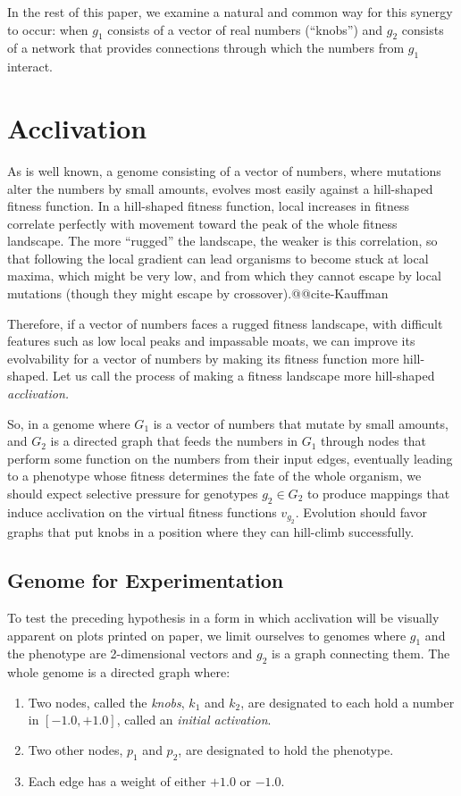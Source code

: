 \documentclass[letterpaper]{article}
\begin{document}
In the rest of this paper, we examine a natural and common way for this
synergy to occur: when $g_1$ consists of a vector of real numbers (``knobs'')
and $g_2$ consists of a network that provides connections through which the
numbers from $g_1$ interact.

\section{Acclivation}

As is well known, a genome consisting of a vector of numbers, where mutations
alter the numbers by small amounts, evolves most easily against a hill-shaped
fitness function. In a hill-shaped fitness function, local increases in
fitness correlate perfectly with movement toward the peak of the whole fitness
landscape. The more ``rugged'' the landscape, the weaker is this correlation,
so that following the local gradient can lead organisms to become stuck at
local maxima, which might be very low, and from which they cannot escape by
local mutations (though they might escape by crossover).@@cite-Kauffman

Therefore, if a vector of numbers faces a rugged fitness landscape, with
difficult features such as low local peaks and impassable moats, we can
improve its evolvability for a vector of numbers by making its fitness
function more hill-shaped. Let us call the process of making a fitness
landscape more hill-shaped \textit{acclivation.}

So, in a genome where $G_1$ is a vector of numbers that mutate by small
amounts, and $G_2$ is a directed graph that feeds the numbers in $G_1$ through
nodes that perform some function on the numbers from their input edges,
eventually leading to a phenotype whose fitness determines the fate of the
whole organism, we should expect selective pressure for genotypes $g_2 \in
G_2$ to produce mappings that induce acclivation on the virtual fitness
functions $v_{g_2}$. Evolution should favor graphs that put knobs in a
position where they can hill-climb successfully.

\subsection{Genome for Experimentation}

To test the preceding hypothesis in a form in which acclivation will be
visually apparent on plots printed on paper, we limit ourselves to genomes
where $g_1$ and the phenotype are 2-dimensional vectors and $g_2$ is a graph
connecting them.  The whole genome is a directed graph where:
\begin{enumerate}
   \item Two nodes, called the \textit{knobs}, $k_1$ and $k_2$, are designated
      to each hold a number in $[-1.0, +1.0]$, called an \textit{initial
      activation}.
   \item Two other nodes, $p_1$ and $p_2$, are designated to hold the
      phenotype.
   \item Each edge has a weight of either $+1.0$ or $-1.0$.
\end{enumerate}
\end{document}

